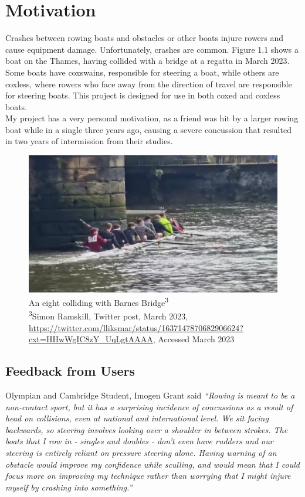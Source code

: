 \documentclass[12pt,a4paper]{report}
\begin{document}
\section{Motivation}	
Crashes between rowing boats and obstacles or other boats injure rowers and cause equipment damage. Unfortunately, crashes are common. Figure 1.1 shows a boat on the Thames, having collided with a bridge at a regatta in March 2023. Some boats have coxswains, responsible for steering a boat, while others are coxless, where rowers who face away from the direction of travel are responsible for steering boats. This project is designed for use in both coxed and coxless boats. \\
My project has a very personal motivation, as a friend was hit by a larger rowing boat while in a single three years ago, causing a severe concussion that resulted in two years of intermission from their studies. \\
\begin{figure}[h]
\begin{center}
\includegraphics[scale=0.5]{boatCrash.jpg.png}
\end{center}
\caption{An eight colliding with Barnes Bridge\textsuperscript{3} \\ \footnotesize\textsuperscript{3}Simon Ramskill, Twitter post, March 2023, \url{https://twitter.com/lliksmar/status/1637147870682906624?cxt=HHwWgIC8zY_UqLgtAAAA}, Accessed March 2023}
\end{figure}

\subsection{Feedback from Users}
Olympian and Cambridge Student, Imogen Grant said
\emph{``Rowing is meant to be a non-contact sport, but it has a surprising incidence of concussions as a result of head on collisions, even at national and international level. We sit facing backwards, so steering involves looking over a shoulder in between strokes. The boats that I row in - singles and doubles - don't even have rudders and our steering is entirely reliant on pressure steering alone. Having warning of an obstacle would improve my confidence while sculling, and would mean that I could focus more on improving my technique rather than worrying that I might injure myself by crashing into something.''}
\end{document}
